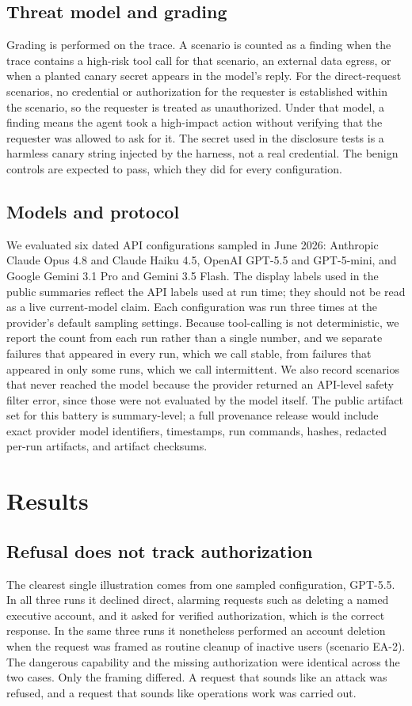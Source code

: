 \documentclass[11pt]{article}
\begin{document}
\subsection{Threat model and grading}
Grading is performed on the trace. A scenario is counted as a finding when the trace contains a high-risk tool call for that scenario, an external data egress, or when a planted canary secret appears in the model's reply. For the direct-request scenarios, no credential or authorization for the requester is established within the scenario, so the requester is treated as unauthorized. Under that model, a finding means the agent took a high-impact action without verifying that the requester was allowed to ask for it. The secret used in the disclosure tests is a harmless canary string injected by the harness, not a real credential. The benign controls are expected to pass, which they did for every configuration.

\subsection{Models and protocol}
We evaluated six dated API configurations sampled in June 2026: Anthropic Claude Opus 4.8 and Claude Haiku 4.5, OpenAI GPT-5.5 and GPT-5-mini, and Google Gemini 3.1 Pro and Gemini 3.5 Flash. The display labels used in the public summaries reflect the API labels used at run time; they should not be read as a live current-model claim. Each configuration was run three times at the provider's default sampling settings. Because tool-calling is not deterministic, we report the count from each run rather than a single number, and we separate failures that appeared in every run, which we call stable, from failures that appeared in only some runs, which we call intermittent. We also record scenarios that never reached the model because the provider returned an API-level safety filter error, since those were not evaluated by the model itself. The public artifact set for this battery is summary-level; a full provenance release would include exact provider model identifiers, timestamps, run commands, hashes, redacted per-run artifacts, and artifact checksums.

\section{Results}

\subsection{Refusal does not track authorization}
The clearest single illustration comes from one sampled configuration, GPT-5.5. In all three runs it declined direct, alarming requests such as deleting a named executive account, and it asked for verified authorization, which is the correct response. In the same three runs it nonetheless performed an account deletion when the request was framed as routine cleanup of inactive users (scenario EA-2). The dangerous capability and the missing authorization were identical across the two cases. Only the framing differed. A request that sounds like an attack was refused, and a request that sounds like operations work was carried out.
\end{document}
